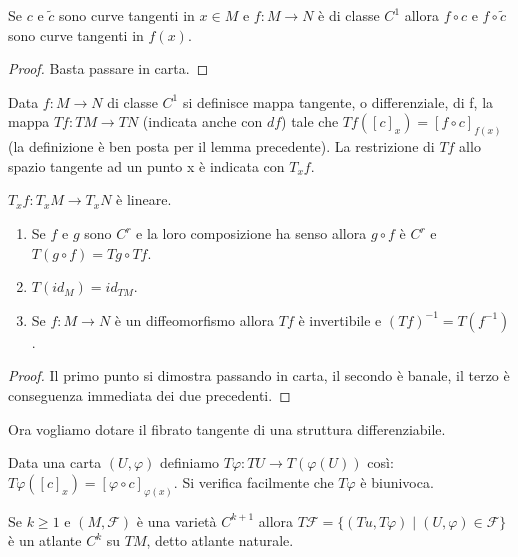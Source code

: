  \begin{lemma}
  Se $c$ e $\tilde{c}$ sono curve tangenti in $x\in M$ e $f:M\to N$ è di classe $C^1$
  allora $f\circ c$ e $f\circ\tilde{c}$ sono curve tangenti in $f(x)$.
 \end{lemma}

 \begin{proof}
  Basta passare in carta.
 \end{proof}

 \begin{definition}
  Data $f:M\to N$ di classe $C^1$ si definisce mappa tangente, o differenziale,
  di f, la mappa $Tf:TM\to TN$ (indicata anche con $df$) tale che $Tf([c]_x)=[f\circ c]_{f(x)}$
  (la definizione è ben posta per il lemma precedente).
  La restrizione di $Tf$ allo spazio tangente ad un punto x è indicata con $T_xf$.
 \end{definition}

 \begin{proposition}
  $T_xf:T_xM\to T_xN$ è lineare.
 \end{proposition}
 
 \begin{theorem}
  \begin{enumerate}[label=\bf\Roman*)]
   \item Se $f$ e $g$ sono $C^r$ e la loro composizione ha senso allora $g\circ f$
   è $C^r$ e $T(g\circ f)=Tg\circ Tf$.
   \item $T(id_M)=id_{TM}$.
   \item Se $f:M\to N$ è un diffeomorfismo allora $Tf$ è invertibile e $(Tf)^{-1}=T(f^{-1})$.
  \end{enumerate}
 \end{theorem}

 \begin{proof}
  Il primo punto si dimostra passando in carta, il secondo è banale, il terzo è
  conseguenza immediata dei due precedenti.
 \end{proof}

 Ora vogliamo dotare il fibrato tangente di una struttura differenziabile.
 
 Data una carta $(U,\varphi)$ definiamo $T\varphi:TU\to T(\varphi(U))$ così:
 $T\varphi([c]_x)=[\varphi\circ c]_{\varphi(x)}$. Si verifica facilmente che $T\varphi$ è biunivoca.
 
 \begin{proposition}
  Se $k\ge 1$ e $(M,\mathcal F)$ è una varietà $C^{k+1}$ allora $T\mathcal F=\{(Tu,T\varphi)\;|\;(U,\varphi)\in\mathcal F\}$
  è un atlante $C^k$ su $TM$, detto atlante naturale.
 \end{proposition}

